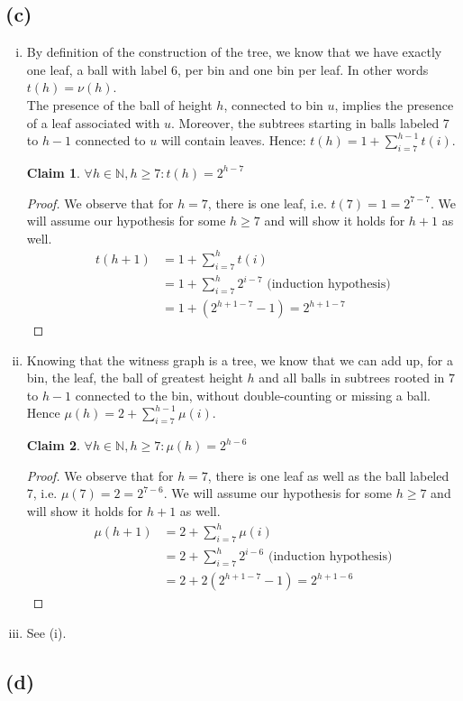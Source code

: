\documentclass[a4paper,german]{article}
\newtheorem{claim}{Claim}
\begin{document}
\subsection*{(c)}
\begin{enumerate}[(i)]
	\item
	By definition of the construction of the tree, we know that we have exactly one leaf, a ball with label 6, per bin and one bin per leaf. In other words \(t(h) = \nu(h)\).  \\
	The presence of the ball of height \(h\), connected to bin \(u\), implies the presence of a leaf associated with \(u\). Moreover, the subtrees starting in balls labeled 7 to \(h-1\) connected to \(u\) will contain leaves. Hence: \(t(h) = 1 + \sum_{i=7}^{h-1} t(i) \).
	\begin{claim} 
		\(\forall h \in \mathbb{N}, h \geq 7: t(h) = 2^{h-7}\)
	\end{claim}
	\begin{proof} 
		We observe that for \(h = 7\), there is one leaf, i.e. \(t(7) = 1 = 2 ^{7-7}.\) We will assume our hypothesis for some \(h \geq 7\) and will show it holds for \(h+1\) as well.
		\begin{align*}
			t(h+1) &= 1 + \sum_{i=7}^{h} t(i) \\
			&= 1 + \sum_{i=7}^{h}2^{i-7} \text{ (induction hypothesis)} \\
			&= 1 + (2^{h+1-7} - 1) = 2^{h+1-7}
		\end{align*}
	\end{proof}
	\item
	Knowing that the witness graph is a tree, we know that we can add up, for a bin, the leaf, the ball of greatest height \(h\) and all balls in subtrees rooted in \(7\) to \(h-1\) connected to the bin, without double-counting or missing a ball. Hence \(\mu(h) = 2 + \sum_{i=7}^{h-1} \mu(i)\). 
	\begin{claim}
		\(\forall h \in \mathbb{N}, h \geq 7: \mu(h) = 2^{h-6}\)
	\end{claim}
	\begin{proof} 
		We observe that for \(h = 7\), there is one leaf as well as the ball labeled 7, i.e. \(\mu(7) = 2 = 2 ^{7-6}.\) We will assume our hypothesis for some \(h \geq 7\) and will show it holds for \(h+1\) as well.
		\begin{align*}
			\mu(h+1) &= 2 + \sum_{i=7}^{h} \mu(i) \\
			&= 2 + \sum_{i=7}^{h}2^{i-6} \text{ (induction hypothesis)} \\
			&= 2 + 2(2^{h+1-7} - 1) = 2^{h+1-6}
		\end{align*}
	\end{proof}


\item 
See (i).
\end{enumerate}
\subsection*{(d)}
\end{document}
